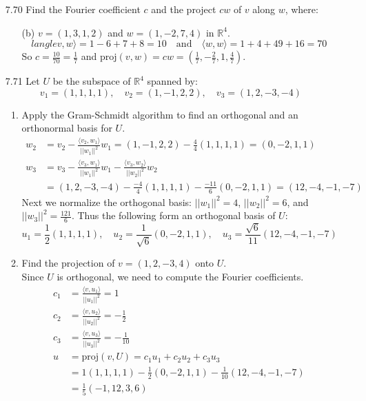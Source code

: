 \documentclass[12pt]{article}
\theoremstyle{definition}
\theoremstyle{plain}
\begin{document}
\begin{enumerate}
\item[7.70]Find the Fourier coefficient $c$ and the project $cw$ of $v$ along $w$, where:
	\begin{enumerate}
	\item[(b)] $v=(1,3,1,2)$ and $w=(1,-2,7,4)$ in $\mathbb{R}^4$.
		\[ langle v,w \rangle=1-6+7+8=10 \quad \mathrm{and} \quad \langle w,w \rangle=1+4+49+16=70 \]
		So $c=\frac{10}{70}=\frac{1}{7}$ and $\mathrm{proj}(v,w)=cw=(\frac{1}{7},-\frac{2}{7},1,\frac{4}{7})$.
	\end{enumerate}

\item[7.71]Let $U$ be the subspace of $\mathbb{R}^4$ spanned by:
\[ v_1=(1,1,1,1), \quad v_2=(1,-1,2,2), \quad v_3=(1,2,-3,-4) \]
	\begin{enumerate}
	\item Apply the Gram-Schmidt algorithm to find an orthogonal and an orthonormal basis for $U$.
		\begin{align*}
		w_2&=v_2-\frac{\langle v_2,w_1\rangle}{||w_1||^2}w_1 = (1,-1,2,2)-\frac{4}{4}(1,1,1,1) = (0,-2,1,1)\\
		w_3&=v_3-\frac{\langle v_3,w_1 \rangle}{||w_1||^2}w_1-\frac{ \langle v_3,w_2 \rangle}{||w_2||^2}w_2\\
		&= (1,2,-3,-4)-\frac{-4}{4}(1,1,1,1)-\frac{-11}{6}(0,-2,1,1) = (12,-4,-1,-7)
		\end{align*}
		Next we normalize the orthogonal basis: $||w_1||^2 = 4$, $||w_2||^2=6$, and $||w_3||^2=\frac{121}{6}$. Thus the following form an orthogonal basis of $U$:
		\[ u_1=\frac{1}{2}(1,1,1,1), \quad u_2=\frac{1}{\sqrt{6}}(0,-2,1,1), \quad u_3 = \frac{\sqrt{6}}{11}(12,-4,-1,-7) \]
	\item Find the projection of $v=(1,2,-3,4)$ onto $U$.\\
	Since $U$ is orthogonal, we need to compute the Fourier coefficients.
	\begin{align*}
	c_1 &= \frac{\langle v,u_1 \rangle}{||u_1||^2} = 1\\
	c_2 &= \frac{\langle v,u_2 \rangle}{||u_2||^2} = -\frac{1}{2}\\
	c_3 &= \frac{\langle v,u_3 \rangle}{||u_3||^2} = -\frac{1}{10}\\
	u&=\mathrm{proj}(v,U)=c_1u_1+c_2u_2+c_3u_3\\
	&= 1(1,1,1,1)-\frac{1}{2}(0,-2,1,1)-\frac{1}{10}(12,-4,-1,-7)\\
	&= \frac{1}{5}(-1,12,3,6)
	\end{align*}
	\end{enumerate}


\end{enumerate}
\end{document}

